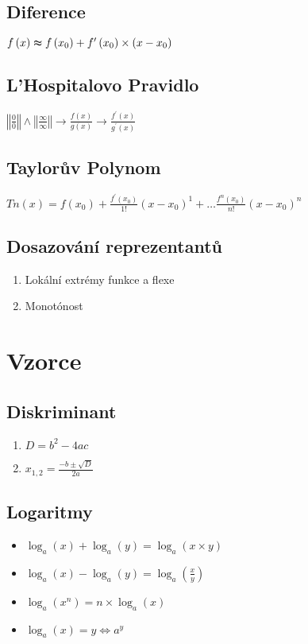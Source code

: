 \documentclass{article}
\begin{document}
\begin{multicols}{4}
\subsection{Diference}
$f\left(x\right)\thickapprox f\left(x_{0}\right)+f^{\prime}\left(x_{0}\right)\times\left(x-x_{0}\right)$
\subsection{L'Hospitalovo Pravidlo}
$\left\Vert \frac{0}{0}\right\Vert \wedge\left\Vert \frac{\infty}{\infty}\right\Vert \rightarrow\frac{f\left(x\right)}{g\left(x\right)}\rightarrow\frac{f^{\prime}\left(x\right)}{g^{\prime}\left(x\right)}$
\subsection{Taylorův Polynom}
$Tn\left(x\right)=f\left(x_{0}\right)+\frac{f^{\prime}\left(x_{0}\right)}{1!}\left(x-x_{0}\right)^{1}+\ldots\frac{f^{n}\left(x_{0}\right)}{n!}\left(x-x_{0}\right)^{n}$
\subsection{Dosazování reprezentantů}
\begin{enumerate}
    \item Lokální extrémy funkce a flexe
    \item Monotónost
\end{enumerate}
\section{Vzorce}
\subsection{Diskriminant}
\begin{enumerate}
    \item $D=b^{2}-4ac$
    \item $x_{1,2}=\frac{-b\pm\sqrt{D}}{2a}$
\end{enumerate}
\subsection{Logaritmy}
\begin{itemize}
    \item $\log_{a}\left(x\right)+\log_{a}\left(y\right)=\log_{a}\left(x\times y\right)$
    \item $\log_{a}\left(x\right)-\log_{a}\left(y\right)=\log_{a}\left(\frac{x}{y}\right)$
    \item $\log_{a}\left(x^{n}\right)=n\times\log_{a}\left(x\right)$
    \item $\log_{a}\left(x\right)=y\Leftrightarrow a^{y}$
\end{itemize}

\end{multicols}
\end{document}
